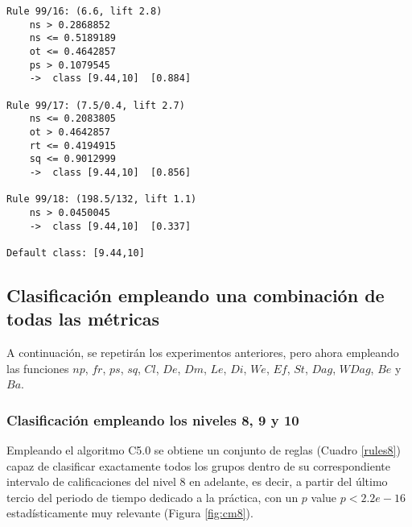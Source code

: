 \begin{tcolorbox}[title=Reglas de clasificación para identificar intervalos de notas.]
\begin{multicols}{3}
\begin{verbatim}
Rule 99/16: (6.6, lift 2.8)
	ns > 0.2868852
	ns <= 0.5189189
	ot <= 0.4642857
	ps > 0.1079545
	->  class [9.44,10]  [0.884]

Rule 99/17: (7.5/0.4, lift 2.7)
	ns <= 0.2083805
	ot > 0.4642857
	rt <= 0.4194915
	sq <= 0.9012999
	->  class [9.44,10]  [0.856]

Rule 99/18: (198.5/132, lift 1.1)
	ns > 0.0450045
	->  class [9.44,10]  [0.337]
	
Default class: [9.44,10]
    \end{verbatim}
  \end{multicols}
\label{rulesbegin2}
\end{tcolorbox}

\subsection{Clasificación empleando una combinación de todas las métricas}

A continuación, se repetirán los experimentos anteriores, pero ahora empleando las funciones $np$, $fr$, $ps$, $sq$, $Cl$, $De$, $Dm$, $Le$, $Di$, $We$, $Ef$, $St$, $Dag$, $WDag$, $Be$ y $Ba$.

\subsubsection{Clasificación empleando los niveles 8, 9 y 10}

Empleando el algoritmo C5.0 se obtiene un conjunto de reglas (Cuadro \ref{rules8}) capaz de clasificar exactamente todos los grupos dentro de su correspondiente intervalo de calificaciones del nivel $8$ en adelante, es decir, a partir del último tercio del periodo de tiempo dedicado a la práctica, con un $p$ value $p < 2.2e-16$ estadísticamente muy relevante (Figura \ref{fig:cm8}).

